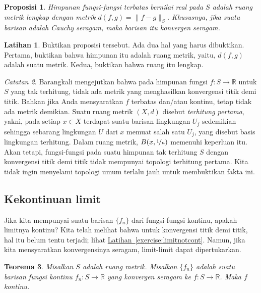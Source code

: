 \documentclass[12pt,openany]{book}
\newcommand{\snorm}[1]{\lVert {#1} \rVert}
\newcommand{\R}{{\mathbb{R}}}
\newcommand{\myindex}[1]{#1\index{#1}}
\theoremstyle{plain}
\newtheorem{thm}{Teorema}[section]
\newtheorem{prop}[thm]{Proposisi}
\theoremstyle{remark}
\newtheorem{remark}[thm]{Catatan}
\theoremstyle{definition}
\newenvironment{exbox}{%
    \def\FrameCommand{\vrule width 1pt \relax\hspace{10pt}}%
    \MakeFramed{\advance\hsize-\width\FrameRestore}%
}{%
    \endMakeFramed
}
\theoremstyle{exercise}
\newtheorem{exercise}{Latihan}[section]
\theoremstyle{example}
\newcommand{\exerciseref}[1]{\hyperref[#1]{Latihan~\ref*{#1}}}
\begin{document}
\begin{prop}
Himpunan fungsi-fungsi terbatas bernilai real pada $S$ adalah ruang metrik lengkap dengan
metrik $d(f,g) = \snorm{f-g}_S$.
Khususnya, jika suatu barisan adalah Cauchy seragam, maka barisan itu
konvergen seragam.
\end{prop}

\begin{exbox}
\begin{exercise}
Buktikan proposisi tersebut.  Ada dua hal yang harus dibuktikan.  Pertama,
buktikan bahwa himpunan itu adalah ruang metrik, yaitu, $d(f,g)$ adalah suatu metrik.
Kedua, buktikan bahwa ruang itu lengkap.
\end{exercise}
\end{exbox}

\begin{remark}
Barangkali mengejutkan bahwa pada himpunan fungsi $f \colon S \to
\R$ untuk $S$ yang tak terhitung, tidak ada metrik yang menghasilkan konvergensi titik demi titik.
Bahkan jika Anda mensyaratkan $f$ terbatas dan/atau kontinu, tetap
tidak ada metrik demikian.
Suatu ruang metrik $(X,d)$ disebut \emph{\myindex{terhitung pertama}},
yakni, pada setiap $x \in X$ terdapat suatu barisan lingkungan $U_j$ sedemikian
sehingga sebarang lingkungan $U$ dari $x$ memuat salah satu $U_j$, yang disebut
basis lingkungan terhitung.  Dalam ruang metrik, $B(x,\nicefrac{1}{n})$
memenuhi keperluan itu.  Akan tetapi, fungsi-fungsi pada suatu himpunan tak terhitung $S$ dengan konvergensi
titik demi titik tidak mempunyai topologi terhitung pertama.  Kita tidak ingin
menyelami topologi umum terlalu jauh untuk membuktikan fakta ini.
\end{remark}

\subsection{Kekontinuan limit}

Jika kita mempunyai suatu barisan $\{ f_n \}$ dari fungsi-fungsi kontinu,
apakah limitnya kontinu?  Kita telah melihat bahwa untuk konvergensi
titik demi titik, hal itu belum tentu terjadi; lihat \exerciseref{exercise:limitnotcont}.
Namun, jika kita mensyaratkan konvergensinya seragam, limit-limit dapat
dipertukarkan.

\begin{thm} \label{thm:uniformlimitcont}
Misalkan $S$ adalah ruang metrik.
Misalkan $\{ f_n \}$ adalah 
suatu barisan fungsi kontinu $f_n \colon S \to \R$ yang konvergen
seragam ke $f \colon S \to \R$.  Maka $f$ kontinu.
\end{thm}
\end{document}
